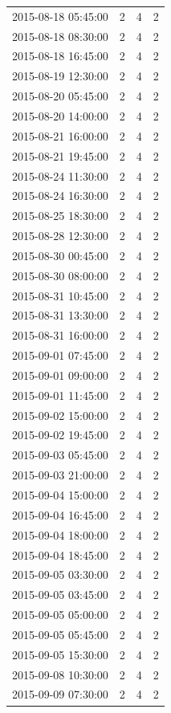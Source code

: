 \begin{tabular}{lrrr}
2015-08-18 05:45:00 & 2 & 4 & 2 \\
2015-08-18 08:30:00 & 2 & 4 & 2 \\
2015-08-18 16:45:00 & 2 & 4 & 2 \\
2015-08-19 12:30:00 & 2 & 4 & 2 \\
2015-08-20 05:45:00 & 2 & 4 & 2 \\
2015-08-20 14:00:00 & 2 & 4 & 2 \\
2015-08-21 16:00:00 & 2 & 4 & 2 \\
2015-08-21 19:45:00 & 2 & 4 & 2 \\
2015-08-24 11:30:00 & 2 & 4 & 2 \\
2015-08-24 16:30:00 & 2 & 4 & 2 \\
2015-08-25 18:30:00 & 2 & 4 & 2 \\
2015-08-28 12:30:00 & 2 & 4 & 2 \\
2015-08-30 00:45:00 & 2 & 4 & 2 \\
2015-08-30 08:00:00 & 2 & 4 & 2 \\
2015-08-31 10:45:00 & 2 & 4 & 2 \\
2015-08-31 13:30:00 & 2 & 4 & 2 \\
2015-08-31 16:00:00 & 2 & 4 & 2 \\
2015-09-01 07:45:00 & 2 & 4 & 2 \\
2015-09-01 09:00:00 & 2 & 4 & 2 \\
2015-09-01 11:45:00 & 2 & 4 & 2 \\
2015-09-02 15:00:00 & 2 & 4 & 2 \\
2015-09-02 19:45:00 & 2 & 4 & 2 \\
2015-09-03 05:45:00 & 2 & 4 & 2 \\
2015-09-03 21:00:00 & 2 & 4 & 2 \\
2015-09-04 15:00:00 & 2 & 4 & 2 \\
2015-09-04 16:45:00 & 2 & 4 & 2 \\
2015-09-04 18:00:00 & 2 & 4 & 2 \\
2015-09-04 18:45:00 & 2 & 4 & 2 \\
2015-09-05 03:30:00 & 2 & 4 & 2 \\
2015-09-05 03:45:00 & 2 & 4 & 2 \\
2015-09-05 05:00:00 & 2 & 4 & 2 \\
2015-09-05 05:45:00 & 2 & 4 & 2 \\
2015-09-05 15:30:00 & 2 & 4 & 2 \\
2015-09-08 10:30:00 & 2 & 4 & 2 \\
2015-09-09 07:30:00 & 2 & 4 & 2 \\

\end{tabular}
